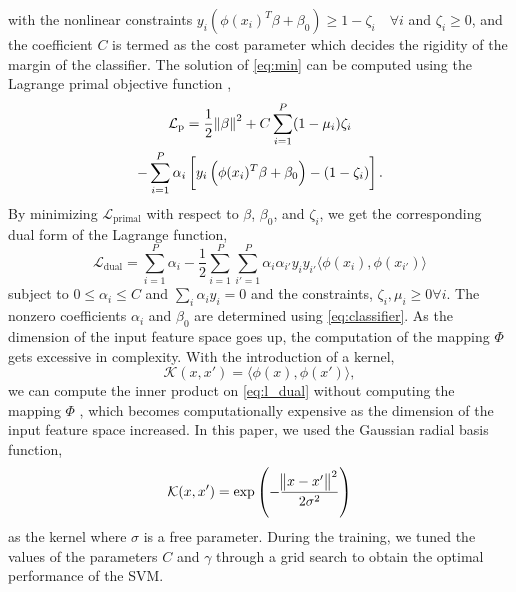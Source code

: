 \documentclass[journal,comsoc]{IEEEtran}
\renewcommand{\^}{\hat}  %
\begin{document}
%
with the nonlinear constraints $y_i (\phi(x_i)^T \beta + \beta_0) \ge 1 - \zeta_i \quad \forall i $ and $ \zeta_i \ge 0$, and the coefficient $C$ is termed as the cost parameter which decides the rigidity of the margin of the classifier. The solution of \eqref{eq:min} can be computed using the Lagrange primal objective function \cite{friedman2001elements},
%
\begin{multline}
  \mathcal L_{\mathrm{p}} = \dfrac{1}{2} \norm{\beta}^2 + C \sum \limits_{i =1}^{P} (1 - \mu_i)\zeta_i \\
  - \sum \limits_{i =1}^{P} \alpha_i \left[ y_i \left( \phi(x_i)^T \beta + \beta_0 \right) - (1 - \zeta_i) \right].
  \label{eq:l_primal}
\end{multline}
%
By minimizing $\mathcal L_{\mathrm{primal}}$ with respect to $\beta$, $\beta_0$, and $\zeta_i$, we get the corresponding dual form of the Lagrange function,
%
\begin{equation}
  \mathcal L_{\mathrm{dual}} = \sum \limits_{i = 1}^{P} \alpha_i - \frac{1}{2} \sum \limits_{i = 1}^{P} \sum_{i' = 1}^{P} \alpha_i \alpha_{i'} y_i y_{i'} \langle \phi(x_i), \phi(x_{i'}) \rangle
  \label{eq:l_dual}
\end{equation}
%
subject to $0 \le \alpha_i \le C$ and $\sum_{i} \alpha_i y_i = 0$ and the constraints, $\zeta_i, \mu_i \ge 0 \forall i$. The nonzero coefficients $\alpha_i$ and $\beta_0$ are determined using \eqref{eq:classifier}. As the dimension of the input feature space goes up, the computation of the mapping $\Phi$ gets excessive in complexity. With the introduction of a kernel,
%
\begin{equation}
  \mathcal K(x,x') = \langle \phi(x), \phi(x') \rangle,
  \label{eq:kernel}
\end{equation}
%
we can compute the inner product on \eqref{eq:l_dual} without  computing the mapping $\Phi$ \cite{scholkopf2002learning}, which becomes computationally expensive as the dimension of the input feature space increased. In this paper, we used the Gaussian radial basis function,
%
\begin{equation}
  \mathcal K(x,x') = \exp {\left(- \frac{\norm{x -x'}^2}{2\sigma^2}\right)}
  \label{eq:rbf}
\end{equation}
%
as the kernel where $\sigma$ is a free parameter. During the training, we tuned the values of the parameters $C$ and $\gamma$ through a grid search to obtain the optimal performance of the SVM.
%
\end{document}
